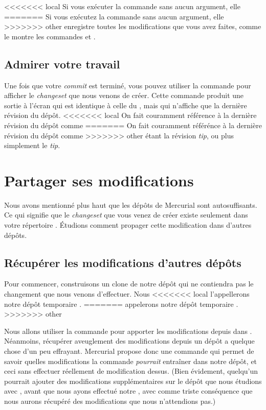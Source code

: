 <<<<<<< local
Si vous exécuter la commande  sans aucun argument, elle
=======
Si vous exécutez la commande  sans aucun argument, elle
>>>>>>> other
enregistre toutes les modifications que vous avez faites, comme le montre
les commandes  et .

\subsection{Admirer votre travail}

Une fois que votre \textit{commit} est terminé, vous pouvez utiliser
la commande  pour afficher le \textit{changeset} que nous
venons de créer. Cette commande produit une sortie à l'écran qui est
identique à celle du , mais qui n'affiche que la dernière
révision du dépôt.
<<<<<<< local
On fait couramment référence à la dernière révision du dépôt comme
=======
On fait couramment référénce à la dernière révision du dépôt comme
>>>>>>> other
étant la révision \textit{tip}, ou plus simplement le \textit{tip}.

\section{Partager ses modifications}

Nous avons mentionné plus haut que les dépôts de Mercurial 
sont autosuffisants. Ce qui signifie que le \textit{changeset} 
que vous venez de créer existe seulement dans votre répertoire 
. Étudions comment propager cette modification
dans d'autres dépôts.

\subsection{Récupérer les modifications d'autres dépôts}
\label{sec:tour:pull}

Pour commencer, construisons un clone de notre dépôt  
qui ne contiendra pas le changement que nous venons d'effectuer. Nous
<<<<<<< local
l'appellerons notre dépôt temporaire .
=======
appelerons notre dépôt temporaire .
>>>>>>> other

Nous allons utiliser la commande  pour apporter les 
modifications depuis  dans .
Néanmoins, récupérer aveuglement des modifications depuis un dépôt
a quelque chose d'un peu effrayant. Mercurial propose donc une 
commande  qui permet de savoir quelles modifications
la commande  \emph{pourrait} entraîner dans notre dépôt,
et ceci sans effectuer réellement de modification dessus.
(Bien évidement, quelqu'un pourrait ajouter des modifications
supplémentaires sur le dépôt que nous étudions avec ,
avant que nous ayons effectué notre , avec comme 
triste conséquence que nous aurons récupéré des modifications que 
nous n'attendions pas.)

